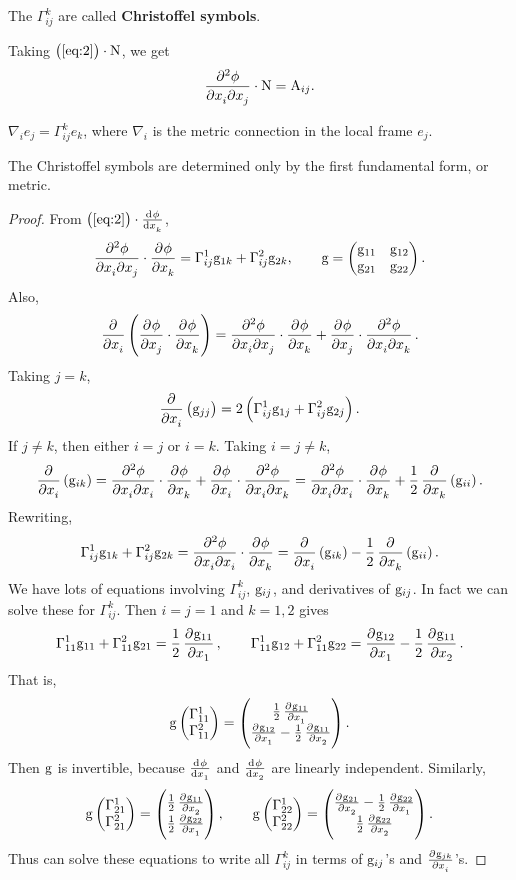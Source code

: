 \begin{definition}
The $ \Gamma_{ij}^k $ are called \textbf{Christoffel symbols}.
\end{definition}

Taking $ \br{\ref{eq:2}} \cdot \N $, we get
$$ \dmd{\phi}{2}{x_i}{}{x_j}{} \cdot \N = \A_{ij}. $$

\begin{note*}
$ \nabla_ie_j = \Gamma_{ij}^ke_k $, where $ \nabla_i $ is the metric connection in the local frame $ e_j $.
\end{note*}

\begin{proposition}
The Christoffel symbols are determined only by the first fundamental form, or metric.
\end{proposition}

\begin{proof}
From $ \br{\ref{eq:2}} \cdot \tod{\phi}{x_k} $,
$$ \dmd{\phi}{2}{x_i}{}{x_j}{} \cdot \dpd{\phi}{x_k} = \Gamma_{ij}^1\g_{1k} + \Gamma_{ij}^2\g_{2k}, \qquad \g = \twobytwo{\g_{11}}{\g_{12}}{\g_{21}}{\g_{22}}. $$
Also,
$$ \dpd{}{x_i}\br{\dpd{\phi}{x_j} \cdot \dpd{\phi}{x_k}} = \dmd{\phi}{2}{x_i}{}{x_j}{} \cdot \dpd{\phi}{x_k} + \dpd{\phi}{x_j} \cdot \dmd{\phi}{2}{x_i}{}{x_k}{}. $$
Taking $ j = k $,
$$ \dpd{}{x_i}\br{\g_{jj}} = 2\br{\Gamma_{ij}^1\g_{1j} + \Gamma_{ij}^2\g_{2j}}. $$
If $ j \ne k $, then either $ i = j $ or $ i = k $. Taking $ i = j \ne k $,
$$ \dpd{}{x_i}\br{\g_{ik}} = \dmd{\phi}{2}{x_i}{}{x_i}{} \cdot \dpd{\phi}{x_k} + \dpd{\phi}{x_i} \cdot \dmd{\phi}{2}{x_i}{}{x_k}{} = \dmd{\phi}{2}{x_i}{}{x_i}{} \cdot \dpd{\phi}{x_k} + \dfrac{1}{2}\dpd{}{x_k}\br{\g_{ii}}. $$
Rewriting,
$$ \Gamma_{ij}^1\g_{1k} + \Gamma_{ij}^2\g_{2k} = \dmd{\phi}{2}{x_i}{}{x_i}{} \cdot \dpd{\phi}{x_k} = \dpd{}{x_i}\br{\g_{ik}} - \dfrac{1}{2}\dpd{}{x_k}\br{\g_{ii}}. $$
We have lots of equations involving $ \Gamma_{ij}^k $, $ \mathrm{g}_{ij} $, and derivatives of $ \mathrm{g}_{ij} $. In fact we can solve these for $ \Gamma_{ij}^k $. Then $ i = j = 1 $ and $ k = 1, 2 $ gives
$$ \Gamma_{11}^1\g_{11} + \Gamma_{11}^2\g_{21} = \dfrac{1}{2}\dpd{\g_{11}}{x_1}, \qquad \Gamma_{11}^1\g_{12} + \Gamma_{11}^2\g_{22} = \dpd{\g_{12}}{x_1} - \dfrac{1}{2}\dpd{\g_{11}}{x_2}. $$
That is,
$$ \g\twobyone{\Gamma_{11}^1}{\Gamma_{11}^2} = \twobyone{\tfrac{1}{2}\tpd{\g_{11}}{x_1}}{\tpd{\g_{12}}{x_1} - \tfrac{1}{2}\tpd{\g_{11}}{x_2}}. $$
Then $ \mathrm{g} $ is invertible, because $ \tod{\phi}{x_1} $ and $ \tod{\phi}{x_2} $ are linearly independent. Similarly,
$$ \g\twobyone{\Gamma_{21}^1}{\Gamma_{21}^2} = \twobyone{\tfrac{1}{2}\tpd{\g_{11}}{x_2}}{\tfrac{1}{2}\tpd{\g_{22}}{x_1}}, \qquad \g\twobyone{\Gamma_{22}^1}{\Gamma_{22}^2} = \twobyone{\tpd{\g_{21}}{x_2} - \tfrac{1}{2}\tpd{\g_{22}}{x_1}}{\tfrac{1}{2}\tpd{\g_{22}}{x_2}}. $$
Thus can solve these equations to write all $ \Gamma_{ij}^k $ in terms of $ \mathrm{g}_{ij} $'s and $ \tpd{\g_{jk}}{x_i} $'s.
\end{proof}

